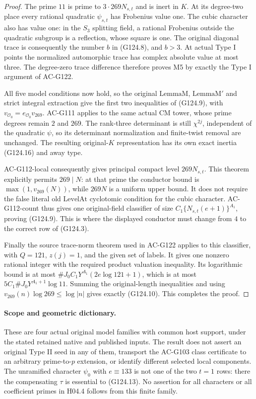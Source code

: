 \begin{proof}
The prime \(11\) is prime to \(3\cdot269N_{s,t}\) and is
inert in \(K\).  At its degree-two place every rational
quadratic \(\psi_{s,t}\) has Frobenius value one.
The cubic character also has value one: in the
\(S_3\) splitting field, a rational Frobenius outside
the quadratic subgroup is a reflection, whose square
is one.  The original diagonal trace is consequently
the number \(b\) in (G124.8), and \(b>3\).
At actual Type I points the normalized automorphic
trace has complex absolute value at most three.
The degree-zero trace difference therefore proves M5
by exactly the Type I argument of AC-G122.

All five model conditions now hold, so the original
\(\mathrm{LemmaM}\), \(\mathrm{LemmaM'}\) and strict
integral extraction give the first two inequalities
of (G124.9), with \(v_{\mathcal O_0}=e_{\mathcal O_0}v_{269}\).
AC-G111 applies to the same actual CM tower, whose
prime degrees remain \(2\) and \(269\).  The rank-three
determinant is still \(\chi^{2j}\), independent of the
quadratic \(\psi\), so its determinant normalization
and finite-twist removal are unchanged.
The resulting original-\(K\) representation has its
own exact inertia (G124.16) and away type.

AC-G112-local consequently gives principal compact
level \(269N_{s,t}\).  This theorem explicitly permits
\(269\mid N\): at that prime the conductor bound is
\(\max(1,v_{269}(N))\), while \(269N\) is a uniform
upper bound.  It does not require the false literal
old \(\mathrm{LevelAt}\) cyclotomic condition for
the cubic character.  AC-G112-count thus gives one
original-field classifier of size
\(C_1\{N_{s,t}(e+1)\}^{A_1}\), proving (G124.9).
This is where the displayed conductor must change
from \(4\) to the correct row of (G124.3).

Finally the source trace-norm theorem used in
AC-G122 applies to this classifier, with \(Q=121\),
\(z(j)=1\), and the given set of labels.  It gives
one nonzero rational integer with the required
product valuation inequality.  Its logarithmic
bound is at most
\(\#J_0C_1Y^{A_1}(2e\log121+1)\), which is at most
\(5C_1\#J_0Y^{A_1+1}\log11\).
Summing the original-length inequalities and using
\(v_{269}(n)\log269\le\log|n|\) gives exactly
(G124.10).  This completes the proof.
\end{proof}

\paragraph{Scope and geometric dictionary.}
These are four actual original model families with common host
support, under the stated retained native and published inputs.
The result does not assert an original Type II seed in any of
them, transport the AC-G103 class certificate to an arbitrary
prime-to-\(p\) extension, or identify different selected local
components.  The unramified character \(\psi_0\) with
\(e\equiv133\) is not one of the two \(t=1\) rows: there
the compensating \(\tau\) is essential to (G124.13).
No assertion for all characters or all coefficient primes in
H04.4 follows from this finite family.

